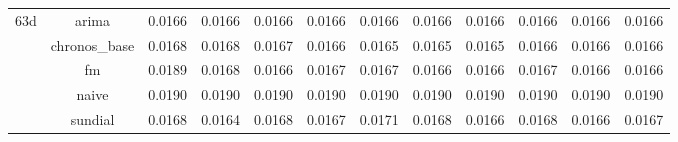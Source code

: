 \begin{table}[H]
{\begin{tabular}{cccccccccccc}
\multirow[c]{5}{*}{63d} & arima & 0.0166 & 0.0166 & 0.0166 & 0.0166 & 0.0166 & 0.0166 & 0.0166 & 0.0166 & 0.0166 & 0.0166 \\
 & chronos_base & 0.0168 & 0.0168 & 0.0167 & 0.0166 & 0.0165 & 0.0165 & 0.0165 & 0.0166 & 0.0166 & 0.0166 \\
 & fm & 0.0189 & 0.0168 & 0.0166 & 0.0167 & 0.0167 & 0.0166 & 0.0166 & 0.0167 & 0.0166 & 0.0166 \\
 & naive & 0.0190 & 0.0190 & 0.0190 & 0.0190 & 0.0190 & 0.0190 & 0.0190 & 0.0190 & 0.0190 & 0.0190 \\
 & sundial & 0.0168 & 0.0164 & 0.0168 & 0.0167 & 0.0171 & 0.0168 & 0.0166 & 0.0168 & 0.0166 & 0.0167 \\
\bottomrule
\end{tabular}

 }
\end{table}